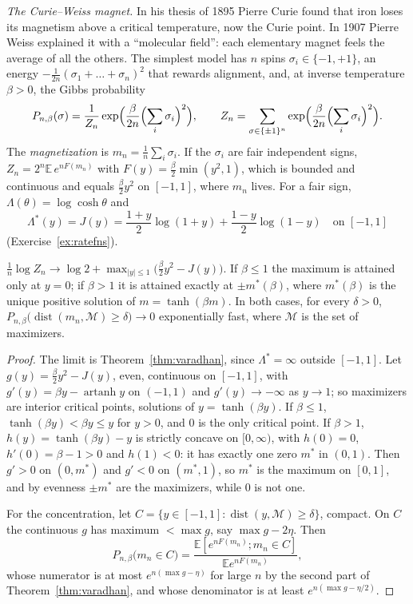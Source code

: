 \emph{The Curie--Weiss magnet.} In his thesis of 1895 Pierre Curie found that iron loses its magnetism above a critical temperature, now the Curie point. In 1907 Pierre
Weiss explained it with a ``molecular field'': each elementary magnet feels the average of all the others. The simplest model has $n$ spins $\sigma_i\in\{-1,+1\}$, an energy
$-\frac1{2n}(\sigma_1+\dots+\sigma_n)^2$ that rewards alignment, and, at inverse temperature $\beta>0$, the Gibbs probability
\[
P_{n,\beta}(\sigma)=\frac1{Z_n}\exp\Bigl(\frac\beta{2n}\Bigl(\sum_i\sigma_i\Bigr)^2\Bigr),\qquad Z_n=\sum_{\sigma\in\{\pm1\}^n}\exp\Bigl(\frac\beta{2n}\Bigl(\sum_i\sigma_i\Bigr)^2\Bigr).
\]
The \emph{magnetization} is $m_n=\frac1n\sum_i\sigma_i$. If the $\sigma_i$ are fair independent signs, $Z_n=2^n\mathbb E\,e^{nF(m_n)}$ with $F(y)=\frac\beta2\min(y^2,1)$, which is bounded
and continuous and equals $\frac\beta2y^2$ on $[-1,1]$, where $m_n$ lives. For a fair sign, $\Lambda(\theta)=\log\cosh\theta$ and
\[
\Lambda^*(y)=J(y)=\frac{1+y}2\log(1+y)+\frac{1-y}2\log(1-y)\quad\text{on }[-1,1]
\]
(Exercise~\ref{ex:ratefns}).

\begin{theorem}\label{thm:curieweiss}
$\frac1n\log Z_n\to\log2+\max_{|y|\le1}\bigl(\frac\beta2y^2-J(y)\bigr)$. If $\beta\le1$ the maximum is attained only at $y=0$; if $\beta>1$ it is attained exactly at $\pm m^*(\beta)$, where
$m^*(\beta)$ is the unique positive solution of $m=\tanh(\beta m)$. In both cases, for every $\delta>0$, $P_{n,\beta}\bigl(\operatorname{dist}(m_n,\mathcal M)\ge\delta\bigr)\to0$ exponentially fast,
where $\mathcal M$ is the set of maximizers.
\end{theorem}
\begin{proof}
The limit is Theorem~\ref{thm:varadhan}, since $\Lambda^*=\infty$ outside $[-1,1]$. Let $g(y)=\frac\beta2y^2-J(y)$, even, continuous on $[-1,1]$, with $g'(y)=\beta y-\operatorname{artanh}y$ on
$(-1,1)$ and $g'(y)\to-\infty$ as $y\to1$; so maximizers are interior critical points, solutions of $y=\tanh(\beta y)$. If $\beta\le1$, $\tanh(\beta y)<\beta y\le y$ for $y>0$, and $0$ is the only
critical point. If $\beta>1$, $h(y)=\tanh(\beta y)-y$ is strictly concave on $[0,\infty)$, with $h(0)=0$, $h'(0)=\beta-1>0$ and $h(1)<0$: it has exactly one zero $m^*$ in $(0,1)$. Then
$g'>0$ on $(0,m^*)$ and $g'<0$ on $(m^*,1)$, so $m^*$ is the maximum on $[0,1]$, and by evenness $\pm m^*$ are the maximizers, while $0$ is not one.

For the concentration, let $C=\{y\in[-1,1]:\operatorname{dist}(y,\mathcal M)\ge\delta\}$, compact. On $C$ the continuous $g$ has maximum $<\max g$, say $\max g-2\eta$. Then
\[
P_{n,\beta}\bigl(m_n\in C\bigr)=\frac{\mathbb E[e^{nF(m_n)};m_n\in C]}{\mathbb Ee^{nF(m_n)}},
\]
whose numerator is at most $e^{n(\max g-\eta)}$ for large $n$ by the second part of Theorem~\ref{thm:varadhan}, and whose denominator is at least $e^{n(\max g-\eta/2)}$.
\end{proof}

